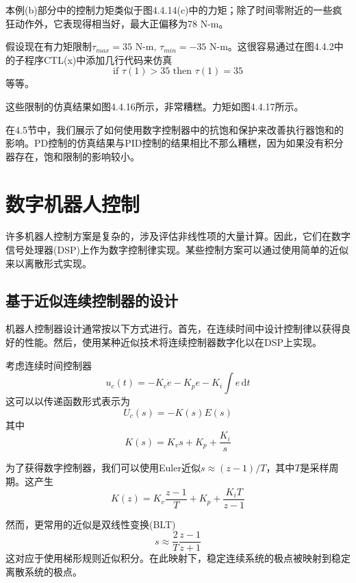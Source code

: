 \documentclass[UTF8]{ctexart}
\theoremstyle{definition}
\newcommand{\dd}{\mathrm{d}}
\begin{document}
\begin{examplebox}[示例4.4-4：经典关节控制和力矩饱和限制]
本例(b)部分中的控制力矩类似于图4.4.14(c)中的力矩；除了时间零附近的一些疯狂动作外，它表现得相当好，最大正偏移为78 N-m。

假设现在有力矩限制$\tau_{max} = 35$ N-m, $\tau_{min} = -35$ N-m。这很容易通过在图4.4.2中的子程序CTL(x)中添加几行代码来仿真
\begin{equation}
    \text{if } \tau(1) > 35 \text{ then } \tau(1) = 35
\end{equation}
等等。

这些限制的仿真结果如图4.4.16所示，非常糟糕。力矩如图4.4.17所示。

在4.5节中，我们展示了如何使用数字控制器中的抗饱和保护来改善执行器饱和的影响。PD控制的仿真结果与PID控制的结果相比不那么糟糕，因为如果没有积分器存在，饱和限制的影响较小。
\end{examplebox}

\section{数字机器人控制}

许多机器人控制方案是复杂的，涉及评估非线性项的大量计算。因此，它们在数字信号处理器(DSP)上作为数字控制律实现。某些控制方案可以通过使用简单的近似来以离散形式实现。

\subsection{基于近似连续控制器的设计}

机器人控制器设计通常按以下方式进行。首先，在连续时间中设计控制律以获得良好的性能。然后，使用某种近似技术将连续控制器数字化以在DSP上实现。

考虑连续时间控制器
\begin{equation}
    u_c(t) = -K_v\dot{e} - K_pe - K_i\int e\,\dd t
\end{equation}
这可以以传递函数形式表示为
\begin{equation}
    U_c(s) = -K(s)E(s)
\end{equation}
其中
\begin{equation}
    K(s) = K_vs + K_p + \frac{K_i}{s}
\end{equation}

为了获得数字控制器，我们可以使用Euler近似$s \approx (z - 1)/T$，其中$T$是采样周期。这产生
\begin{equation}
    K(z) = K_v\frac{z - 1}{T} + K_p + \frac{K_iT}{z - 1}
\end{equation}

然而，更常用的近似是双线性变换(BLT)
\begin{equation}
    s \approx \frac{2}{T}\frac{z - 1}{z + 1}
\end{equation}
这对应于使用梯形规则近似积分。在此映射下，稳定连续系统的极点被映射到稳定离散系统的极点。
\end{document}
